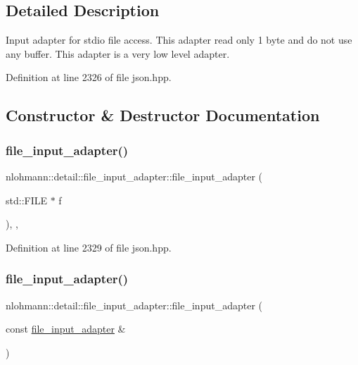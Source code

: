 \subsection{Detailed Description}
Input adapter for stdio file access. This adapter read only 1 byte and do not use any buffer. This adapter is a very low level adapter. 

Definition at line 2326 of file json.\+hpp.



\subsection{Constructor \& Destructor Documentation}
\mbox{\label{classnlohmann_1_1detail_1_1file__input__adapter_aeade050f2793280503be93feff2ece5b}} 
\subsubsection{\texorpdfstring{file\_input\_adapter()}{file\_input\_adapter()}\hspace{0.1cm}{\footnotesize\ttfamily [1/3]}}
{\footnotesize\ttfamily nlohmann\+::detail\+::file\+\_\+input\+\_\+adapter\+::file\+\_\+input\+\_\+adapter (\begin{DoxyParamCaption}\item[{std\+::\+F\+I\+LE $\ast$}]{f }\end{DoxyParamCaption})\hspace{0.3cm}{\ttfamily [inline]}, {\ttfamily [explicit]}, {\ttfamily [noexcept]}}



Definition at line 2329 of file json.\+hpp.

\mbox{\label{classnlohmann_1_1detail_1_1file__input__adapter_a308099b496a0cba2123a06fe99a95d02}} 
\subsubsection{\texorpdfstring{file\_input\_adapter()}{file\_input\_adapter()}\hspace{0.1cm}{\footnotesize\ttfamily [2/3]}}
{\footnotesize\ttfamily nlohmann\+::detail\+::file\+\_\+input\+\_\+adapter\+::file\+\_\+input\+\_\+adapter (\begin{DoxyParamCaption}\item[{const \mbox{\hyperlink{classnlohmann_1_1detail_1_1file__input__adapter}{file\+\_\+input\+\_\+adapter}} \&}]{ }\end{DoxyParamCaption})\hspace{0.3cm}{\ttfamily [delete]}}

